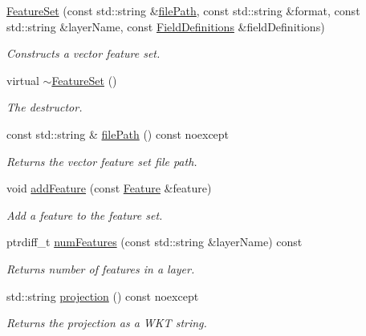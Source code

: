 \begin{DoxyCompactItemize}
\item 
\hyperlink{group___vector_module_gad9d6de87ab5e9557f542c0691ca088e0}{Feature\+Set} (const std\+::string \&\hyperlink{group___vector_module_ga438beae23c8c7333e1763addeb99b286}{file\+Path}, const std\+::string \&format, const std\+::string \&layer\+Name, const \hyperlink{namespacedg_1_1deepcore_1_1vector_a89a39c2fa657ff95f116cfed4a951386}{Field\+Definitions} \&field\+Definitions)
\begin{DoxyCompactList}\small\item\em Constructs a vector feature set. \end{DoxyCompactList}\item 
virtual \hyperlink{classdg_1_1deepcore_1_1vector_1_1_feature_set_acc3af359cff5a59c1ca421e8970c6118}{$\sim$\+Feature\+Set} ()
\begin{DoxyCompactList}\small\item\em The destructor. \end{DoxyCompactList}\item 
const std\+::string \& \hyperlink{group___vector_module_ga438beae23c8c7333e1763addeb99b286}{file\+Path} () const noexcept
\begin{DoxyCompactList}\small\item\em Returns the vector feature set file path. \end{DoxyCompactList}\item 
void \hyperlink{group___vector_module_ga9117c49056efd1ac51c2bb74043b50d6}{add\+Feature} (const \hyperlink{classdg_1_1deepcore_1_1vector_1_1_feature}{Feature} \&feature)
\begin{DoxyCompactList}\small\item\em Add a feature to the feature set. \end{DoxyCompactList}\item 
ptrdiff\+\_\+t \hyperlink{group___vector_module_ga6ea15b282c93cedd1ddc676f1146e967}{num\+Features} (const std\+::string \&layer\+Name) const 
\begin{DoxyCompactList}\small\item\em Returns number of features in a layer. \end{DoxyCompactList}\item 
std\+::string \hyperlink{group___vector_module_ga6067c0ad1fc35879804d30756d6af8d8}{projection} () const noexcept
\begin{DoxyCompactList}\small\item\em Returns the projection as a W\+KT string. \end{DoxyCompactList}\item 

\end{DoxyCompactItemize}
